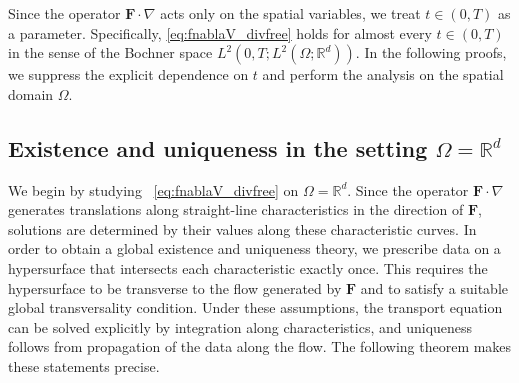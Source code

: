 \documentclass[12pt]{article}
\begin{document}
Since the operator $\mathbf{F} \cdot \nabla$ acts only on the spatial variables, we treat $t \in (0, T)$ as a parameter. Specifically, \eqref{eq:fnablaV_divfree} holds for almost every $t \in (0,T)$ in the sense of the Bochner space $L^2(0,T; L^2(\Omega; \mathbb{R}^d))$. In the following proofs, we suppress the explicit dependence on $t$ and perform the analysis on the spatial domain $\Omega$.


\subsection{Existence and uniqueness in the setting $\Omega=\mathbb{R}^d$}\label{sec:noncharacteristic}
We begin by studying ~\eqref{eq:fnablaV_divfree} on   $\Omega=\mathbb{R}^d$. Since the operator $\mathbf F\cdot\nabla$ generates translations along straight-line characteristics in the direction of $\mathbf F$, solutions are determined by their values along these characteristic curves. In order to obtain a global existence and uniqueness theory, we prescribe data on a hypersurface that intersects each characteristic exactly once. This requires the hypersurface to be transverse to the flow generated by $\mathbf F$ and to satisfy a suitable global transversality condition. Under these assumptions, the transport equation can be solved explicitly by integration along characteristics, and uniqueness follows from propagation of the data along the flow. The following theorem makes these statements precise.
\end{document}
